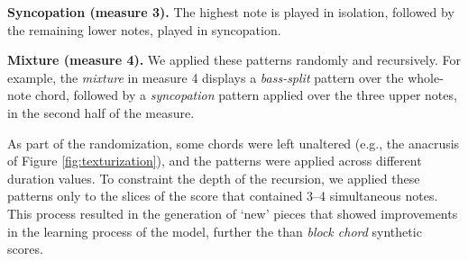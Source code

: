\textbf{Syncopation (measure 3).} The highest note is played in isolation, followed by the remaining lower notes, played in syncopation.

\textbf{Mixture (measure 4).} We applied these patterns randomly and recursively. For example, the \emph{mixture} in measure 4 displays a \emph{bass-split} pattern over the whole-note chord, followed by a \emph{syncopation} pattern applied over the three upper notes, in the second half of the measure. 

As part of the randomization, some chords were left unaltered (e.g., the anacrusis of Figure \ref{fig:texturization}), and the patterns were applied across different duration values. 
To constraint the depth of the recursion, we applied these patterns only to the slices of the score that contained 3--4 simultaneous notes.  
This process resulted in the generation of `new' pieces that showed improvements in the learning process of the model, further the than \emph{block chord} synthetic scores.


